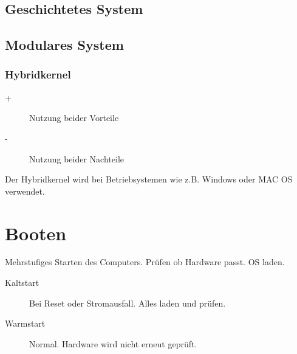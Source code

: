 \documentclass[12pt,a4paper]{article}
\begin{document}
	\subsection{Geschichtetes System}

	\subsection{Modulares System}

	\subsubsection{Hybridkernel}
		\begin{description}
			\item[+]{Nutzung beider Vorteile}
			\item[-]{Nutzung beider Nachteile}
		\end{description}
		Der Hybridkernel wird bei Betriebsystemen wie z.B. Windows oder MAC OS verwendet.

	
\section{Booten}
	Mehrstufiges Starten des Computers. Prüfen ob Hardware passt. OS laden.\\
	\begin{description}
		\item[Kaltstart] Bei Reset oder Stromausfall. Alles laden und prüfen.
		\item[Warmstart] Normal. Hardware wird nicht erneut geprüft.  
	\end{description}
\end{document}
